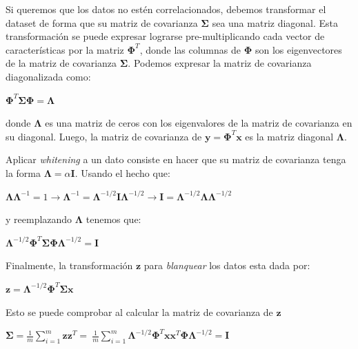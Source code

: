\documentclass[11pt,spanish]{article}
\begin{document}
Si queremos que los datos no estén correlacionados, debemos transformar el dataset de forma que su matriz de covarianza $\mathbf{\Sigma}$ sea una matriz diagonal. Esta transformación se puede expresar lograrse pre-multiplicando cada vector de características por la matriz $\mathbf{\Phi}^T$, donde las columnas de $\mathbf{\Phi}$ son los eigenvectores de la matriz de covarianza $\mathbf{\Sigma}$. Podemos expresar la matriz de covarianza diagonalizada como:

\begin{center}
	\begin{math}
		\mathbf{\Phi}^T \mathbf{\Sigma} \mathbf{\Phi} = \mathbf{\Lambda}
	\end{math}
\end{center}
donde $\mathbf{\Lambda}$ es una matriz de ceros con los eigenvalores de la matriz de covarianza en su diagonal. Luego, la matriz de covarianza de $\mathbf{y} = \mathbf{\Phi}^T \mathbf{x}$ es la matriz diagonal $\mathbf{\Lambda}$. \par
Aplicar \textit{whitening} a un dato consiste en hacer que su matriz de covarianza tenga la forma $\mathbf{\Lambda} = \alpha \mathbf{I}$. Usando el hecho que:

\begin{center}
	\begin{math}
		\mathbf{\Lambda}\mathbf{\Lambda}^{-1} = 1 \rightarrow \mathbf{\Lambda}^{-1} = \mathbf{\Lambda}^{-1/2} \mathbf{I} \mathbf{\Lambda}^{-1/2} \rightarrow  \mathbf{I} = \mathbf{\Lambda}^{-1/2} \mathbf{\Lambda} \mathbf{\Lambda}^{-1/2}
	\end{math}
\end{center}

y reemplazando $\mathbf{\Lambda}$ tenemos que:

\begin{center}
	\begin{math}
	\mathbf{\Lambda}^{-1/2} \mathbf{\Phi}^T \mathbf{\Sigma} \mathbf{\Phi} \mathbf{\Lambda}^{-1/2} = \mathbf{I}
	\end{math}
\end{center}

Finalmente, la transformación $\mathbf{z}$ para \textit{blanquear} los datos esta dada por:
\begin{center}
	\begin{math}
	\mathbf{z} = \mathbf{\Lambda}^{-1/2} \mathbf{\Phi}^T \mathbf{\Sigma} \mathbf{x}
	\end{math}
\end{center}

Esto se puede comprobar al calcular la matriz de covarianza de $\mathbf{z}$
\begin{center}
	\begin{math}
		\mathbf{\Sigma} = \frac{1}{m} \sum_{i=1}^{m} \mathbf{z} \mathbf{z}^T = \
		\frac{1}{m} \sum_{i=1}^{m} \mathbf{\Lambda}^{-1/2} \mathbf{\Phi}^T \mathbf{x} \mathbf{x}^T  \mathbf{\Phi} \mathbf{\Lambda}^{-1/2} = \mathbf{I}
	\end{math}
\end{center}
\end{document}
